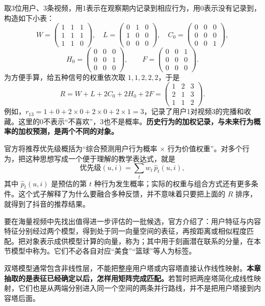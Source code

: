 \documentclass[a4paper,12pt,twoside,openany,fontset=none]{ctexbook}
\let\oldsum\sum
\renewcommand{\sum}{\displaystyle\oldsum}
\numberwithin{equation}{chapter}
\begin{document}
取3位用户、3条视频，用1表示在观察期内记录到相应行为，用0表示没有记录到，构造如下小表：
\[
 W=\begin{pmatrix}1&1&1\\1&1&1\\1&1&0\end{pmatrix},\quad
 L=\begin{pmatrix}0&1&0\\1&0&0\\0&0&0\end{pmatrix},\quad
 C_0=\begin{pmatrix}0&0&0\\0&0&0\\0&0&1\end{pmatrix},
\]
\[
 H_0=\begin{pmatrix}0&0&0\\0&0&1\\0&0&0\end{pmatrix},\qquad
 F=\begin{pmatrix}0&0&1\\0&0&0\\0&0&0\end{pmatrix}.
\]
为方便手算，给五种信号的权重依次取 $1,1,2,2,2$，于是
\[
 R=W+L+2C_0+2H_0+2F
  =\begin{pmatrix}1&2&3\\2&1&3\\1&1&2\end{pmatrix}.
\]
例如，$r_{13}=1+0+2\times0+2\times0+2\times1=3$，记录了用户1对视频3的完播和收藏。这里的0不表示“不喜欢”，3也不是概率。\textbf{历史行为的加权记录，与未来行为概率的加权预测，是两个不同的对象。}

官方将推荐优先级概括为“综合预测用户行为概率 $\times$ 行为价值权重”。对多个行为，把这种思想写成一个便于理解的教学表达式，就是
\[
 \text{优先级}(u,i)=\sum_t w_t\,\widehat p_t(u,i),
\]
其中 $\widehat p_t(u,i)$ 是预估的第 $t$ 种行为发生概率；实际的权重与组合方式还有更多条件。这个式子解释了为什么要融合多种反馈，并不意味着只要把上面的 $R$ 排序，就得到了抖音的推荐结果。\nobreak\cite{douyin-behavior}

要在海量视频中先找出值得进一步评估的一批候选，官方介绍了：用户特征与内容特征分别经过两个模型，得到处于同一向量空间的表征，再按距离或相似程度匹配。把对象表示成供模型计算的向量，称为；其中用于刻画潜在联系的分量，在本节模型中称为。它们不必各自对应“美食”“篮球”等人为标签。\nobreak\cite{douyin-models}

双塔模型通常包含非线性层，不能把整座用户塔或内容塔直接认作线性映射。\textbf{本章抽取的是表征已经确定以后，怎样用矩阵完成匹配。}若暂时把两座塔简化成线性映射，它们也是从两端分别进入同一个空间的两条并行路线，并不是把用户塔接到内容塔后面。
\end{document}
